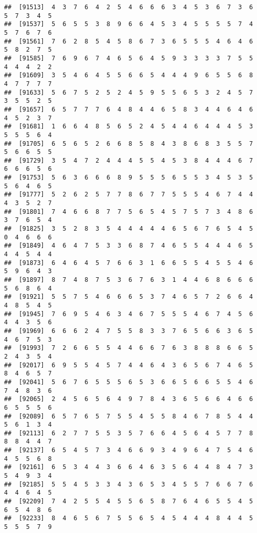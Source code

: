 \documentclass[
]{book}
\begin{document}
\begin{verbatim}
##  [91513]  4  3  7  6  4  2  5  4  6  6  6  3  4  5  3  6  7  3  6  5  7  3  4  5
##  [91537]  5  6  5  5  3  8  9  6  6  4  5  3  4  5  5  5  5  7  4  5  7  6  7  6
##  [91561]  7  6  2  8  5  4  5  8  6  7  3  6  5  5  5  4  6  4  6  5  8  2  7  5
##  [91585]  7  6  9  6  7  4  6  5  6  4  5  9  3  3  3  3  7  5  5  4  4  4  2  2
##  [91609]  3  5  4  6  4  5  5  6  6  5  4  4  4  9  6  5  5  6  8  4  7  7  7  7
##  [91633]  5  6  7  5  2  5  2  4  5  9  5  5  6  5  3  2  4  5  7  3  5  5  2  5
##  [91657]  6  5  7  7  7  6  4  8  4  4  6  5  8  3  4  4  6  4  6  4  5  2  3  7
##  [91681]  1  6  6  4  8  5  6  5  2  4  5  4  4  6  4  4  4  5  3  5  5  5  6  4
##  [91705]  6  5  6  5  2  6  6  8  5  8  4  3  8  6  8  3  5  5  7  5  6  6  5  5
##  [91729]  3  5  4  7  2  4  4  4  5  5  4  5  3  8  4  4  4  6  7  6  6  6  5  6
##  [91753]  5  6  3  6  6  6  8  9  5  5  5  6  5  5  3  4  5  3  5  5  6  4  6  5
##  [91777]  5  2  6  2  5  7  7  8  6  7  7  5  5  5  4  6  7  4  4  4  3  5  2  7
##  [91801]  7  4  6  6  8  7  7  5  6  5  4  5  7  5  7  3  4  8  6  3  7  6  5  4
##  [91825]  3  5  2  8  3  5  4  4  4  4  4  6  5  6  7  6  5  4  5  0  4  6  6  6
##  [91849]  4  6  4  7  5  3  3  6  8  7  4  6  5  5  4  4  4  6  5  4  4  5  4  4
##  [91873]  6  4  6  4  5  7  6  6  3  1  6  6  5  5  4  5  5  4  6  5  9  6  4  3
##  [91897]  8  7  4  8  7  5  3  6  7  6  3  1  4  4  6  8  6  6  6  5  6  8  6  4
##  [91921]  5  5  7  5  4  6  6  6  5  3  7  4  6  5  7  2  6  6  4  4  8  5  4  5
##  [91945]  7  6  9  5  4  6  3  4  6  7  5  5  5  4  6  7  4  5  6  4  4  3  5  6
##  [91969]  6  6  6  2  4  7  5  5  8  3  3  7  6  5  6  6  3  6  5  4  6  7  5  3
##  [91993]  7  2  6  6  5  5  4  4  6  6  7  6  3  8  8  8  6  6  5  2  4  3  5  4
##  [92017]  6  9  5  5  4  5  7  4  4  6  4  3  6  5  6  7  4  6  5  8  4  6  5  7
##  [92041]  5  6  7  6  5  5  5  6  5  3  6  6  5  6  6  5  5  4  6  7  4  8  3  6
##  [92065]  2  4  5  6  5  6  4  9  7  8  4  3  6  5  6  6  4  6  6  6  5  5  5  6
##  [92089]  6  5  7  6  5  7  5  5  4  5  5  8  4  6  7  8  5  4  4  5  6  1  3  4
##  [92113]  6  2  7  7  5  5  3  5  7  6  6  4  5  6  4  5  7  7  8  8  8  4  4  7
##  [92137]  6  5  4  5  7  3  4  6  6  9  3  4  9  6  4  7  5  4  6  4  5  5  6  8
##  [92161]  6  5  3  4  4  3  6  6  4  6  3  5  6  4  4  8  4  7  3  5  4  9  3  4
##  [92185]  5  5  4  5  3  3  4  3  6  5  3  4  5  5  7  6  6  7  6  4  4  6  4  5
##  [92209]  7  4  2  5  5  4  5  5  6  5  8  7  6  4  6  5  5  4  5  6  5  4  8  6
##  [92233]  8  4  6  5  6  7  5  5  6  5  4  5  4  4  4  8  4  4  5  5  5  5  7  9

\end{verbatim}
\end{document}
